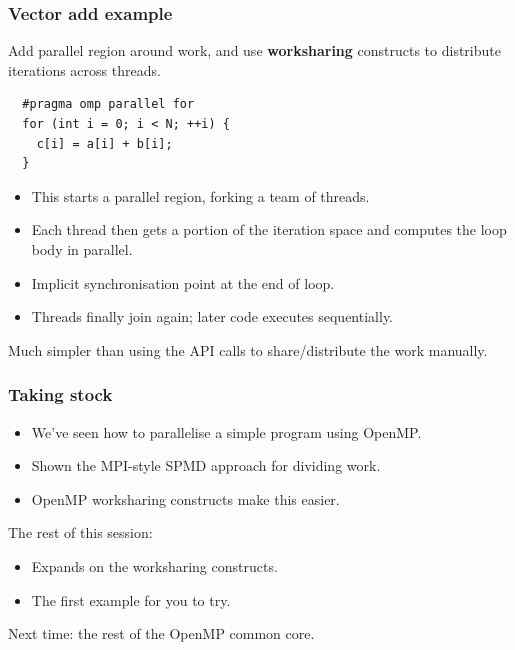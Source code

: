 \documentclass[aspectratio=169]{beamer}
\begin{document}
\begin{frame}[fragile]
\frametitle{Vector add example}
Add parallel region around work, and use {\bf worksharing} constructs to distribute iterations across threads.
\begin{verbatim}
  #pragma omp parallel for
  for (int i = 0; i < N; ++i) {
    c[i] = a[i] + b[i];
  }
\end{verbatim}
\begin{itemize}
  \item This starts a parallel region, forking a team of threads.
  \item Each thread then gets a portion of the iteration space and computes the loop body in parallel.
  \item Implicit synchronisation point at the end of loop.
  \item Threads finally join again; later code executes sequentially.
\end{itemize}

Much simpler than using the API calls to share/distribute the work manually.
\end{frame}

\begin{frame}
\frametitle{Taking stock}
\begin{itemize}
  \item We've seen how to parallelise a simple program using OpenMP.
  \item Shown the MPI-style SPMD approach for dividing work.
  \item OpenMP worksharing constructs make this easier.
\end{itemize}

The rest of this session:
\begin{itemize}
  \item Expands on the worksharing constructs.
  \item The first example for you to try.
\end{itemize}

Next time: the rest of the OpenMP common core.
\end{frame}

\end{document}

